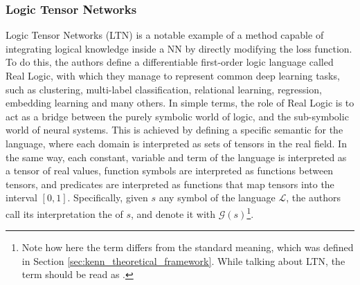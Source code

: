  \subsubsection{Logic Tensor Networks}
 Logic Tensor Networks (LTN) \cite{serafini2016logic} is a notable example of a method capable of integrating logical knowledge inside a NN by directly modifying the loss function. To do this, the authors define a differentiable first-order logic language called Real Logic, with which they manage to represent common deep learning tasks, such as clustering, multi-label classification, relational learning, regression, embedding learning and many others. 
 In simple terms, the role of Real Logic is to act as a bridge between the purely symbolic world of logic, and the sub-symbolic world of neural systems. 
\textcolor{unipd}{ This is achieved by defining a specific semantic for the language, where each domain is interpreted as sets of tensors in the real field. In the same way, each constant, variable and term of the language is interpreted as a tensor of real values, function symbols are interpreted as functions between tensors, and predicates are interpreted as functions that map tensors into the interval $[0,1]$. Specifically, given $s$ any symbol of the language $\mathcal{L}$, the authors call its interpretation the  of $s$, and denote it with $\mathcal{G}(s)$\footnote{Note how here the term  differs from the standard meaning, which was defined in Section \ref{sec:kenn_theoretical_framework}. While talking about LTN, the term  should be read as .}.}
 
